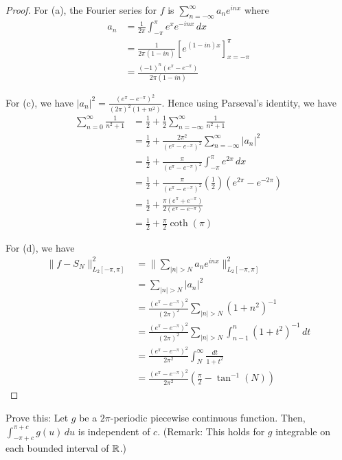 \documentclass{article}
\begin{document}
\begin{proof}
For (a), the Fourier series for $f$ is $\sum_{n = -\infty}^\infty a_n e^{inx}$ where
\begin{align*}
a_n &  = \frac 1 {2 \pi} \int_{-\pi}^{\pi} e^x e^{-inx} \, dx
\\ & =  \frac 1 {2 \pi (1 - in)} \left[ e^{(1 - in)x} \right]_{x = -\pi}^{\pi}
\\ & =  \frac {(-1)^n(e^{\pi} - e^{-\pi})} {2 \pi (1 - in)} 
\end{align*}

For (c), we have $|a_n|^2 = \frac{(e^{\pi} - e^{-\pi})^2}{(2 \pi)^2(1 + n^2)}$.  Hence using Parseval's identity, we have
\begin{align*}
\sum_{n=0}^\infty  \frac 1 {n^2 +1} & = \frac 1 2 + \frac 1 2 \sum_{n= -\infty}^\infty  \frac 1 {n^2 +1}
\\ & =\frac 1 2  + \frac{2 \pi^2}{(e^{\pi} - e^{-\pi})^2} \sum_{n = -\infty}^\infty |a_n|^2
\\ & =\frac 1 2  + \frac{ \pi}{(e^{\pi} - e^{-\pi})^2} \int_{-\pi}^{\pi} e^{2x} \, dx
\\ & =\frac 1 2  + \frac{ \pi}{(e^{\pi} - e^{-\pi})^2} \left(\frac 1 2 \right) (e^{2 \pi} - e^{-2\pi})
\\ & =\frac 1 2  + \frac{ \pi (e^{ \pi} + e^{-\pi}) }{2(e^{\pi} - e^{-\pi})}  
\\ & = \frac 1 2 + \frac \pi 2 \coth(\pi)
\end{align*}

For (d), we have 
\begin{align*}
\|f - S_N \|_{L_2[-\pi, \pi]}^2 & = \|\sum_{|n| > N} a_n e^{inx} \|_{L_2[-\pi, \pi]}^2
\\ & = \sum_{|n| > N} |a_n|^2
\\ & =  \frac{(e^{\pi} - e^{-\pi})^2}{(2 \pi)^2} \sum_{|n| > N}(1 + n^2)^{-1}
\\ & =  \frac{(e^{\pi} - e^{-\pi})^2}{(2 \pi)^2} \sum_{|n| > N} \int_{n-1}^n (1 + t^2)^{-1} \, dt
\\ & =  \frac{(e^{\pi} - e^{-\pi})^2}{2 \pi^2 } \int_{N}^\infty \frac{dt}{1 + t^2}
\\ & =  \frac{(e^{\pi} - e^{-\pi})^2}{2 \pi^2 } \left( \frac \pi 2  - \tan^{-1}(N)  \right)
\end{align*}
\end{proof}


 Prove this:  Let $g$ be a $2 \pi$-periodic piecewise continuous function. Then, $\int_{-\pi+c}^{\pi + c} g(u) \, du$ is independent of $c$. (Remark: This holds for $g$ integrable on each bounded interval of $\mathbb{R}$.)
\end{document}
